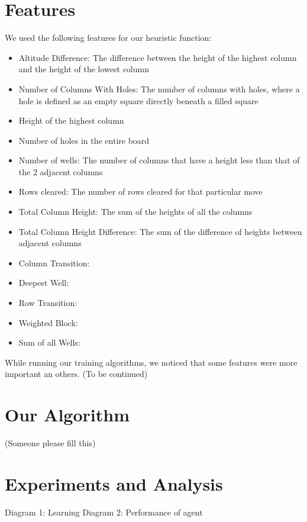 \documentclass{article}
\begin{document}
    \section{Features}
    We used the following features for our heuristic function:
    \begin{itemize}
        \item Altitude Difference: The difference between the height of the highest
        column and the height of the lowest column
        \item Number of Columns With Holes: The number of columns with holes, where a hole
        is defined as an empty square directly beneath a filled square
        \item Height of the highest column
        \item Number of holes in the entire board
        \item Number of wells: The number of columns that have a height less than that of the 2
        adjacent columns
        \item Rows cleared: The number of rows cleared for that particular move
        \item Total Column Height: The sum of the heights of all the columns
        \item Total Column Height Difference: The sum of the difference of heights between adjacent columns
        \item Column Transition:
        \item Deepest Well:
        \item Row Transition:
        \item Weighted Block:
        \item Sum of all Wells:
    \end{itemize}

    While running our training algorithms, we noticed that some features were more important an others. (To be continued)

    \section{Our Algorithm}

    (Someone please fill this)

    \section{Experiments and Analysis}

    Diagram 1: Learning
    Diagram 2: Performance of agent
\end{document}
